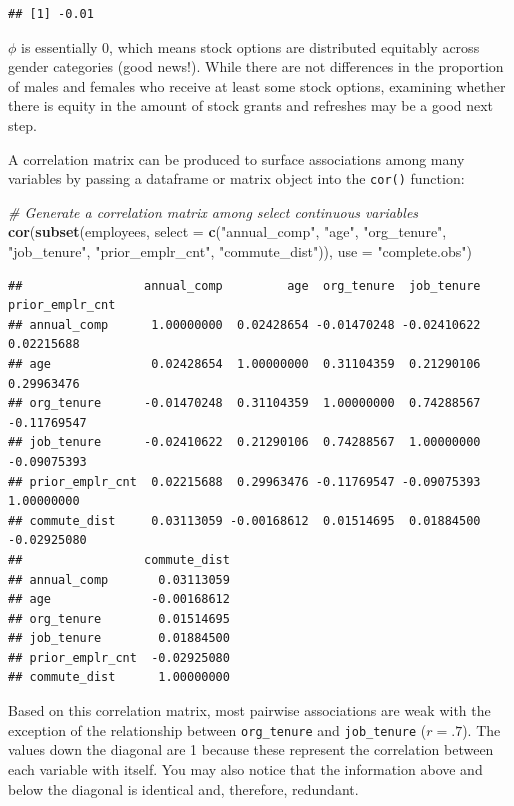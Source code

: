 \documentclass[]{book}
\newenvironment{Shaded}{\begin{snugshade}}{\end{snugshade}}
\newcommand{\CommentTok}[1]{\textcolor[rgb]{0.56,0.35,0.01}{\textit{#1}}}
\newcommand{\DataTypeTok}[1]{\textcolor[rgb]{0.13,0.29,0.53}{#1}}
\newcommand{\KeywordTok}[1]{\textcolor[rgb]{0.13,0.29,0.53}{\textbf{#1}}}
\newcommand{\NormalTok}[1]{#1}
\newcommand{\StringTok}[1]{\textcolor[rgb]{0.31,0.60,0.02}{#1}}
\begin{document}
\begin{verbatim}
## [1] -0.01
\end{verbatim}

\(\phi\) is essentially 0, which means stock options are distributed equitably across gender categories (good news!). While there are not differences in the proportion of males and females who receive at least some stock options, examining whether there is equity in the amount of stock grants and refreshes may be a good next step.

A correlation matrix can be produced to surface associations among many variables by passing a dataframe or matrix object into the \texttt{cor()} function:

\begin{Shaded}
\begin{Highlighting}[]
\CommentTok{# Generate a correlation matrix among select continuous variables}
\KeywordTok{cor}\NormalTok{(}\KeywordTok{subset}\NormalTok{(employees, }\DataTypeTok{select =} \KeywordTok{c}\NormalTok{(}\StringTok{"annual_comp"}\NormalTok{, }\StringTok{"age"}\NormalTok{, }\StringTok{"org_tenure"}\NormalTok{, }\StringTok{"job_tenure"}\NormalTok{, }\StringTok{"prior_emplr_cnt"}\NormalTok{, }\StringTok{"commute_dist"}\NormalTok{)), }\DataTypeTok{use =} \StringTok{"complete.obs"}\NormalTok{)}
\end{Highlighting}
\end{Shaded}

\begin{verbatim}
##                 annual_comp         age  org_tenure  job_tenure prior_emplr_cnt
## annual_comp      1.00000000  0.02428654 -0.01470248 -0.02410622      0.02215688
## age              0.02428654  1.00000000  0.31104359  0.21290106      0.29963476
## org_tenure      -0.01470248  0.31104359  1.00000000  0.74288567     -0.11769547
## job_tenure      -0.02410622  0.21290106  0.74288567  1.00000000     -0.09075393
## prior_emplr_cnt  0.02215688  0.29963476 -0.11769547 -0.09075393      1.00000000
## commute_dist     0.03113059 -0.00168612  0.01514695  0.01884500     -0.02925080
##                 commute_dist
## annual_comp       0.03113059
## age              -0.00168612
## org_tenure        0.01514695
## job_tenure        0.01884500
## prior_emplr_cnt  -0.02925080
## commute_dist      1.00000000
\end{verbatim}

Based on this correlation matrix, most pairwise associations are weak with the exception of the relationship between \texttt{org\_tenure} and \texttt{job\_tenure} (\(r = .7\)). The values down the diagonal are 1 because these represent the correlation between each variable with itself. You may also notice that the information above and below the diagonal is identical and, therefore, redundant.
\end{document}
